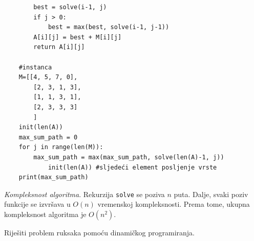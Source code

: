 \begin{solution}
\begin{verbatim}
		best = solve(i-1, j)
		if j > 0:
			best = max(best, solve(i-1, j-1))
		A[i][j] = best + M[i][j]
		return A[i][j]

	#instanca
	M=[[4, 5, 7, 0],
    	[2, 3, 1, 3],
    	[1, 1, 3, 1],
    	[2, 3, 3, 3]
        ]	
	init(len(A))
	max_sum_path = 0
	for j in range(len(M)):
		max_sum_path = max(max_sum_path, solve(len(A)-1, j))
	        init(len(A)) #sljedeći element posljenje vrste
	print(max_sum_path)
\end{verbatim}

\textit{Kompleksnost algoritma}. Rekurzija \texttt{solve} se poziva  $n$ puta. Dalje,  svaki poziv funkcije se izvršava u $O(n)$ vremenskoj kompleksnosti. Prema tome, ukupna kompleksnost algoritma je $O(n^2)$.

\end{solution}



\begin{example}
	Riješiti problem ruksaka pomoću dinamičkog programiranja. 
\end{example}


